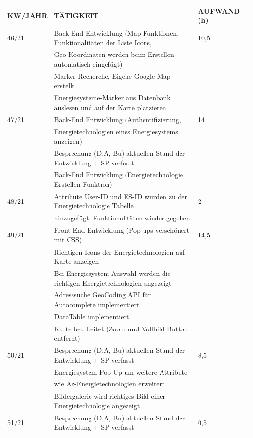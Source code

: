 \newpage
\begin{table}[h]
	\begin{tabular}{|l|l|l|}
		\hline
		\textbf{KW/JAHR} &     \textbf{TÄTIGKEIT}  & 	\textbf{AUFWAND (h)}    \\ \hline
46/21   & Back-End Entwicklung (Map-Funktionen, Funktionalitäten der Liste Icons, & 10,5 \\
		& Geo-Koordinaten werden beim Erstellen automatisch eingefügt)  &  \\ 
		& Marker Recherche, Eigene Google Map erstellt & \\ 
		& Energiesysteme-Marker aus Datenbank auslesen und auf der Karte platzieren & \\ \hline			
47/21   & Back-End Entwicklung (Authentifizierung,  & 14 \\
		& Energietechnologien eines Energiesystems anzeigen)  &  \\ 
		& Besprechung (D,A, Bu) aktuellen Stand der Entwicklung + SP verfasst & \\ 
		& Back-End Entwicklung (Energietechnologie Erstellen Funktion) & \\ \hline		
48/21   & Attribute User-ID und ES-ID wurden zu der Energietechnologie Tabelle & 2 \\
		& hinzugefügt, Funktionalitäten wieder gegeben  &  \\ \hline			
49/21   & Front-End Entwicklung (Pop-ups verschönert mit CSS) & 14,5 \\
		& Richtigen Icons der Energietechnologien auf Karte anzeigen  &  \\ 
		& Bei Energiesystem Auswahl werden die richtigen Energietechnologien angezeigt & \\ 
		& Adresssuche GeoCoding API für Autocomplete implementiert & \\ 	
		& DataTable implementiert  & \\ 
		& Karte bearbeitet (Zoom und Vollbild Button entfernt) & \\ \hline
50/21   & Besprechung (D,A, Bu) aktuellen Stand der Entwicklung + SP verfasst & 8,5 \\
& Energiesystem Pop-Up um weitere Attribute  &  \\ 
& wie Az-Energietechnologien erweitert & \\ 
& Bildergalerie wird richtiges Bild einer Energietechnologie angezeigt& \\ \hline	
51/21   & Besprechung (D,A, Bu) aktuellen Stand der Entwicklung + SP verfasst & 0,5 \\ \hline			

\end{tabular}
\end{table}
